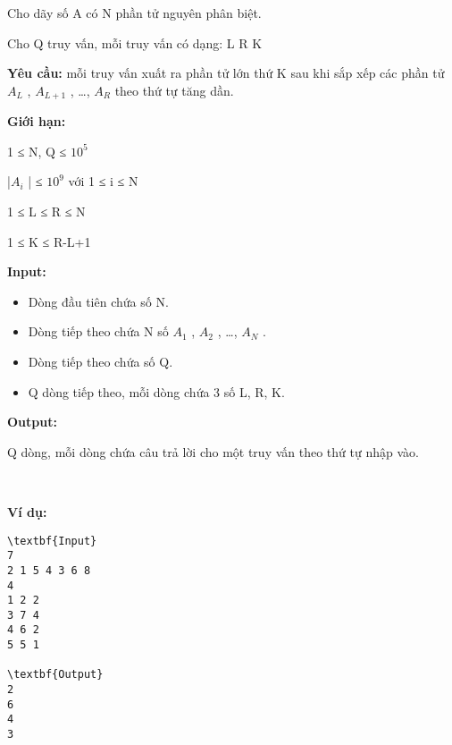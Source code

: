 

Cho dãy số A có N phần tử nguyên phân biệt.

Cho Q truy vấn, mỗi truy vấn có dạng: L R K

\textbf{Yêu cầu: } mỗi truy vấn xuất ra phần tử lớn thứ K sau khi sắp xếp các phần tử $A_{L}$ , $A_{L+1}$ , …, $A_{R}$ theo thứ tự tăng dần.

\textbf{Giới hạn: }

1 ≤ N, Q ≤ $10^{5}$

|$A_{i}$ | ≤ $10^{9}$ với 1 ≤ i ≤ N

1 ≤ L ≤ R ≤ N

1 ≤ K ≤ R-L+1

\textbf{Input: }
\begin{itemize}
	\item Dòng đầu tiên chứa số N.
	\item Dòng tiếp theo chứa N số $A_{1}$ , $A_{2}$ , …, $A_{N}$ .
	\item Dòng tiếp theo chứa số Q.
	\item Q dòng tiếp theo, mỗi dòng chứa 3 số L, R, K.
\end{itemize}

\textbf{Output: }

Q dòng, mỗi dòng chứa câu trả lời cho một truy vấn theo thứ tự nhập vào.

 

\textbf{Ví dụ: }
\begin{verbatim}
\textbf{Input}
7
2 1 5 4 3 6 8
4
1 2 2
3 7 4
4 6 2
5 5 1

\textbf{Output}
2
6
4
3\end{verbatim}
